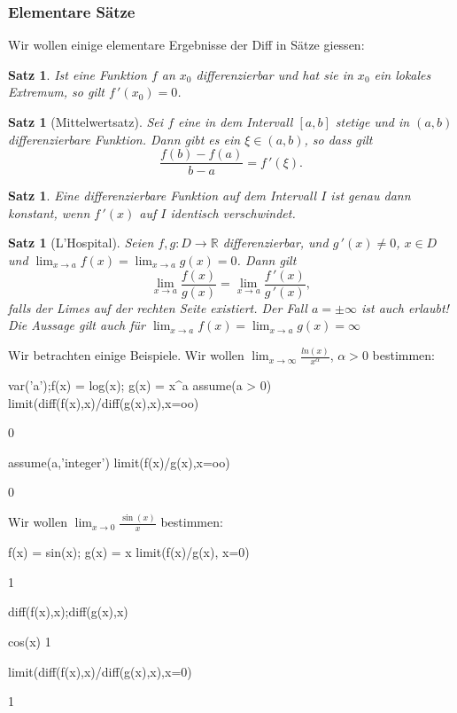 \documentclass[fontsize=12pt,paper=a4,twoside,bibtotoc,idxtotoc,
liststotoc,pagesize,BCOR1.2cm,DIV15,chapterprefix,pagesize=pdftex]{scrbook}
\theoremstyle{plain}
\newtheorem{sz}[equation]{Satz}
\theoremstyle{definition}
\theoremstyle{remark}
\begin{document}
\subsubsection{Elementare Sätze}
Wir wollen einige elementare Ergebnisse der Diff in Sätze giessen:
\begin{sz}
Ist eine Funktion $f$ an $x_0$ differenzierbar und hat sie in $x_0$ ein
lokales Extremum, so gilt $f\,'(x_0)=0$.
\end{sz}
\begin{sz}[Mittelwertsatz]
Sei $f$ eine in dem Intervall $[a,b]$ stetige
und in $(a,b)$ differenzierbare Funktion. Dann gibt es ein $\xi \in
(a,b)$, so dass gilt
\[ \frac{f(b)-f(a)}{b-a}= f\,'(\xi). \]  
\end{sz}
\begin{sz}
Eine differenzierbare Funktion auf dem Intervall $I$ ist genau
dann konstant, wenn $f\,'(x)$ auf $I$ identisch verschwindet.
\end{sz}
\begin{sz}[L'Hospital]
Seien $f,g: D \rightarrow \mathbb{R}$
differenzierbar, und $g\,'(x) \neq 0$, $x \in D$ und 
$\lim_{x \rightarrow a} f(x) = \lim_{x \rightarrow a} g(x)= 0$. Dann gilt
\[ \lim_{x \rightarrow a} \frac{f(x)}{g(x)} =  \lim_{x \rightarrow a}
\frac{f\,'(x)}{g\,'(x)}, \]
falls der Limes auf der rechten Seite existiert.
Der Fall $a=\pm\infty$ ist auch erlaubt!
Die Aussage gilt auch für $\lim_{x \rightarrow a} f(x)=\lim_{x \rightarrow a} g(x)= \infty$ 
\end{sz}
Wir betrachten einige Beispiele. Wir wollen $ \lim_{x \rightarrow \infty} \frac{ln(x)}{x^\alpha}$, $\alpha >0$ bestimmen:
\begin{sagein}
var('a');f(x) = log(x); g(x) = x^a
assume(a > 0)
limit(diff(f(x),x)/diff(g(x),x),x=oo)
\end{sagein}
\begin{sageout}
  0
\end{sageout}
\begin{sagein}
assume(a,'integer')
limit(f(x)/g(x),x=oo)
\end{sagein}
\begin{sageout}
  0
\end{sageout}
Wir wollen $\lim_{x \rightarrow 0} \frac{\sin(x)}{x}$ bestimmen:
\begin{sagein}
f(x) = sin(x); g(x) = x 
limit(f(x)/g(x), x=0)
\end{sagein}
\begin{sageout}
  1
\end{sageout}
\begin{sagein}
diff(f(x),x);diff(g(x),x)
\end{sagein}
\begin{sageout}
cos(x) 
1
\end{sageout}
\begin{sagein}
limit(diff(f(x),x)/diff(g(x),x),x=0)
\end{sagein}
\begin{sageout}
1
\end{sageout}
\end{document}
